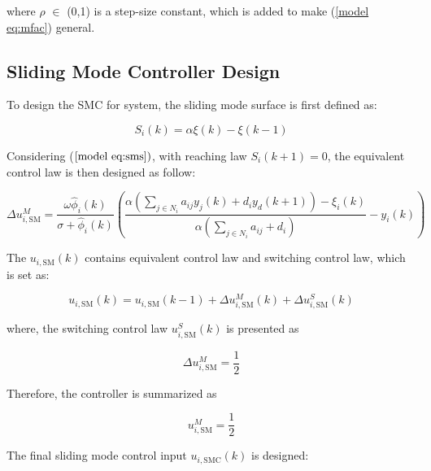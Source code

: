 \documentclass[journal,onecolumn]{IEEEtran}
\begin{document}
where \(\rho\) \(\in\) (0,1) is a step-size constant, which is added to make (\ref{model eq:mfac}) general. 


\subsection{Sliding Mode Controller Design}



To design the SMC for system, the sliding mode surface is first defined as:

\begin{equation}
    \label{model eq:sms}
    S_i(k) = \alpha \xi(k) - \xi(k-1)
\end{equation}

Considering ($ \ref{model eq:sms}) $, with reaching law $ S_i(k+1) = 0 $, the equivalent control law is then designed as follow:

\begin{equation}
    \label{model eq:equivalent_control}
    \Delta u_{i,\text{SM}}^M = \frac{\omega \hat{\phi}_i(k)}{\sigma + \hat{\phi}_i(k)}(\frac{\alpha(\displaystyle \sum_{j \in N_i}a_{ij} y_j(k) + d_i y_d(k+1))-\xi_i(k)}{\alpha(\displaystyle \sum_{j \in N_i}a_{ij}+d_i)} - y_i(k)
    )
\end{equation}


The $ u_{i,\text{SM}}(k) $ contains equivalent control law and switching control law, which is set as:

\begin{equation}
    \label{model eq:u}
    u_{i,\text{SM}}(k) = u_{i,\text{SM}}(k-1) + \Delta u_{i,\text{SM}}^M(k)+ \Delta u_{i,\text{SM}}^S(k)
\end{equation}

where, the switching control law $ u_{i,\text{SM}}^S(k) $ is presented as

\begin{equation}
    \label{model eq:reaching_law}
    \Delta u_{i,\text{SM}}^M = \frac{1}{2}
\end{equation}

Therefore, the controller is summarized as

\begin{equation}
    \label{model eq:sm_controller}
    u_{i,\text{SM}}^M = \frac{1}{2}
\end{equation}


The final sliding mode control input \(u_{i,\text{SMC}}(k)\) is designed:
\end{document}
